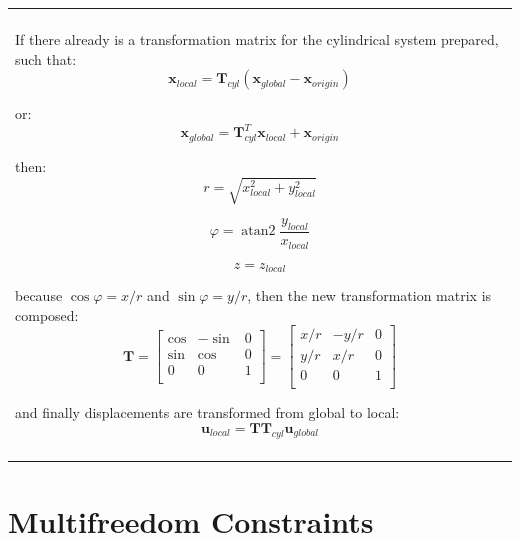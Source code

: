 \documentclass[10pt,b5paper,titlepage]{book}
\newcommand{\m}{\mathbf}
\DeclareMathOperator{\atantwo}{atan2}
\newenvironment{bbox}[1][0.96]
{
    \begin{center}
        \begin{tabular}{|p{#1\textwidth}|}
            \hline\\
}
{
            \\\\\hline
        \end{tabular}
    \end{center}
}
\begin{document}
\begin{bbox}
    If there already is a transformation matrix for the cylindrical system
    prepared, such that:
    \begin{equation}
        \m{x}_{local} = \m{T}_{cyl} \left( \m{x}_{global} - \m{x}_{origin} \right)
    \end{equation}

    or:
    \begin{equation}
        \m{x}_{global} = \m{T}_{cyl}^T \m{x}_{local} + \m{x}_{origin}
    \end{equation}

    then:
    \begin{equation}
        r = \sqrt{x_{local}^2 + y_{local}^2}
    \end{equation}

    \begin{equation}
        \varphi = \atantwo \frac{y_{local}}{x_{local}}
    \end{equation}

    \begin{equation}
        z = z_{local}
    \end{equation}

    because $ \cos \varphi = x / r $ and $ \sin \varphi = y / r $,
    then the new transformation matrix is composed:
    \begin{equation}
        \m{T} = \begin{bmatrix}
            \cos & -\sin & 0 \\
            \sin & \cos & 0 \\
            0 & 0 & 1\\
        \end{bmatrix}
        = \begin{bmatrix}
            x / r & -y/r & 0 \\
            y/r & x/r & 0 \\
            0 & 0 & 1 \\
        \end{bmatrix}
    \end{equation}

    and finally displacements are transformed from global to local:
    \begin{equation}
        \m{u}_{local} = \m{T} \m{T}_{cyl} \m{u}_{global}
    \end{equation}
\end{bbox}


\newpage
\chapter{Multifreedom Constraints}
\end{document}

